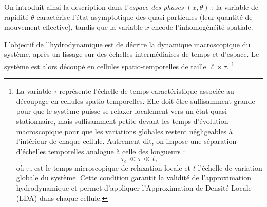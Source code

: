 \smallskip

On introduit ainsi la description dans l’\emph{espace des phases} $(x,\theta)$ :  
la variable de rapidité $\theta$ caractérise l’état asymptotique des quasi-particules (leur quantité de mouvement effective), tandis que la variable $x$ encode l’inhomogénéité spatiale.  

\smallskip




L’objectif de l’hydrodynamique est de décrire la dynamique macroscopique du système, après un lissage sur des échelles intermédiaires de temps et d’espace. Le système est alors découpé en cellules spatio-temporelles de taille $\ell \times \tau$. 
\footnote{
	La variable $\tau$ représente l’échelle de temps caractéristique associée au découpage en cellules spatio-temporelles. Elle doit être suffisamment grande pour que le système puisse se relaxer localement vers un état quasi-stationnaire, mais suffisamment petite devant les temps d’évolution macroscopique pour que les variations globales restent négligeables à l’intérieur de chaque cellule. Autrement dit, on impose une séparation d’échelles temporelles analogue à celle des longueurs :
\[
\tau_c \ll \tau \ll t,
\]
où $\tau_c$ est le temps microscopique de relaxation locale et $t$ l’échelle de variation globale du système. Cette condition garantit la validité de l’approximation hydrodynamique et permet d’appliquer l’Approximation de Densité Locale (\acrshort{LDA}) dans chaque cellule.
}

\smallskip


